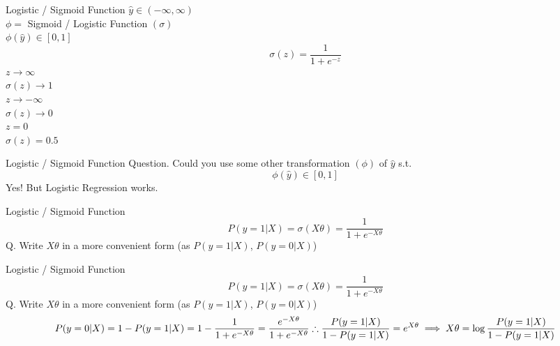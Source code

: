 \documentclass{beamer}
\begin{document}
	\begin{frame}{Logistic / Sigmoid Function}
	    $\hat{y} \in (-\infty, \infty)$ \\
	    $\phi =$ Sigmoid / Logistic Function $(\sigma)$ \\
	    $\phi(\hat{y}) \in [0, 1]$
	    \begin{equation*}
	        \sigma(z) = \frac{1}{1 + e^{-z}}
	    \end{equation*}
	    \hspace{8cm} $z \rightarrow \infty$\\
	    \hspace{8cm} $\sigma(z) \rightarrow 1$\\
	    \hspace{8cm} $z \rightarrow -\infty$\\
	    \hspace{8cm} $\sigma(z) \rightarrow 0$\\
	    \hspace{8cm} $z = 0$\\
	    \hspace{8cm} $\sigma(z) = 0.5$
	\end{frame}
	\begin{frame}{Logistic / Sigmoid Function}
	Question. Could you use some other transformation $(\phi)$ of $\hat{y}$ s.t. \\
	\begin{equation*}
	    \phi(\hat{y}) \in [0, 1]
	\end{equation*}
	Yes! But Logistic Regression works.
	\end{frame}
	\begin{frame}{Logistic / Sigmoid Function}
	    \begin{equation*}
	        P(y = 1 | X) = \sigma(X\theta) = \frac{1}{1 + e^{-X\theta}}    
	    \end{equation*}
	    Q. Write $X\theta$ in a more convenient form (as $P(y = 1|X)$, $P(y = 0 | X)$)\\
	\end{frame}
	\begin{frame}{Logistic / Sigmoid Function}
	    \begin{equation*}
	        P(y = 1 | X) = \sigma(X\theta) = \frac{1}{1 + e^{-X\theta}}    
	    \end{equation*}
	    Q. Write $X\theta$ in a more convenient form (as $P(y = 1|X)$, $P(y = 0 | X)$)\\
	    \begin{equation*}
	        P(y = 0 | X) = 1 - P(y = 1 | X) = 1 - \frac{1}{1 + e^{-X\theta}} = \frac{e^{-X\theta}}{1 + e^{-X\theta}} \\
	        \therefore \frac{P(y = 1|X)}{1 - P(y = 1|X)} = e^{X\theta}
	        \implies X\theta = \log\frac{P(y = 1|X)}{1 - P(y = 1 | X)}
	    \end{equation*}
	\end{frame}
\end{document}
